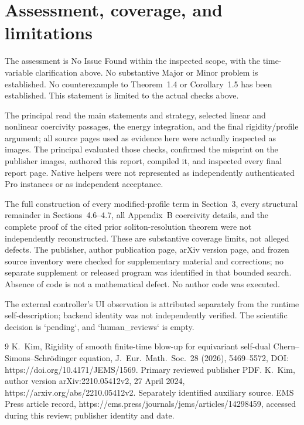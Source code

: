 \documentclass[10pt]{article}
\begin{document}
\section*{Assessment, coverage, and limitations}
The assessment is No Issue Found within the inspected scope, with the time-variable clarification above. No substantive Major or Minor problem is established. No counterexample to Theorem 1.4 or Corollary 1.5 has been established. This statement is limited to the actual checks above.\par
The principal read the main statements and strategy, selected linear and nonlinear coercivity passages, the energy integration, and the final rigidity/profile argument; all source pages used as evidence here were actually inspected as images. The principal evaluated those checks, confirmed the misprint on the publisher images, authored this report, compiled it, and inspected every final report page. Native helpers were not represented as independently authenticated Pro instances or as independent acceptance.\par
The full construction of every modified-profile term in Section 3, every structural remainder in Sections 4.6–4.7, all Appendix B coercivity details, and the complete proof of the cited prior soliton-resolution theorem were not independently reconstructed. These are substantive coverage limits, not alleged defects. The publisher, author publication page, arXiv version page, and frozen source inventory were checked for supplementary material and corrections; no separate supplement or released program was identified in that bounded search. Absence of code is not a mathematical defect. No author code was executed.\par
The external controller’s UI observation is attributed separately from the runtime self-description; backend identity was not independently verified. The scientific decision is `pending`, and `human\_reviews` is empty.\par
9 K. Kim, Rigidity of smooth finite-time blow-up for equivariant self-dual Chern–Simons–Schrödinger equation, J. Eur. Math. Soc. 28 (2026), 5469–5572, DOI: https://doi.org/10.4171/JEMS/1569. Primary reviewed publisher PDF. K. Kim, author version arXiv:2210.05412v2, 27 April 2024, https://arxiv.org/abs/2210.05412v2. Separately identified auxiliary source. EMS Press article record, https://ems.press/journals/jems/articles/14298459, accessed during this review; publisher identity and date.\par
\end{document}
